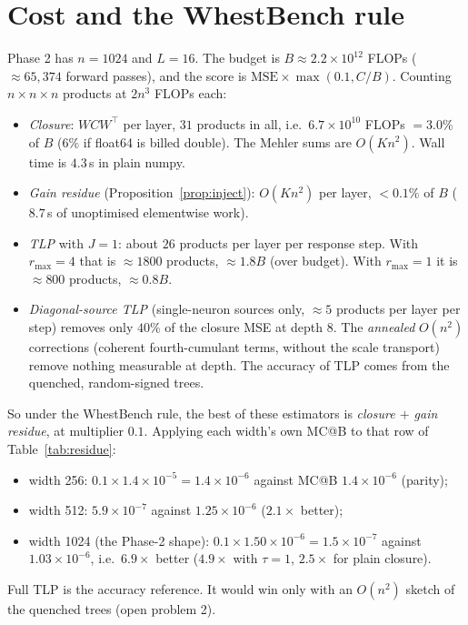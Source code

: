 \documentclass[11pt]{article}
\theoremstyle{definition}
\theoremstyle{remark}
\begin{document}
\section{Cost and the WhestBench rule}\label{sec:cost}
Phase 2 has $n=1024$ and $L=16$. The budget is $B\approx2.2\times10^{12}$ FLOPs ($\approx65{,}374$ forward passes), and the score is $\text{MSE}\times\max(0.1,C/B)$. Counting $n\times n\times n$ products at $2n^3$ FLOPs each:
\begin{itemize}
\item \emph{Closure}: $W C W^\top$ per layer, $31$ products in all, i.e.\ $6.7\times10^{10}$ FLOPs $=3.0\%$ of $B$ ($6\%$ if float64 is billed double). The Mehler sums are $O(Kn^2)$. Wall time is $4.3$\,s in plain numpy.
\item \emph{Gain residue} (Proposition~\ref{prop:inject}): $O(Kn^2)$ per layer, $<0.1\%$ of $B$ ($8.7$\,s of unoptimised elementwise work).
\item \emph{TLP} with $J=1$: about $26$ products per layer per response step. With $r_{\max}=4$ that is $\approx1800$ products, $\approx1.8B$ (over budget). With $r_{\max}=1$ it is $\approx800$ products, $\approx0.8B$.
\item \emph{Diagonal-source TLP} (single-neuron sources only, $\approx5$ products per layer per step) removes only $40\%$ of the closure MSE at depth 8. The \emph{annealed} $O(n^2)$ corrections (coherent fourth-cumulant terms, without the scale transport) remove nothing measurable at depth. The accuracy of TLP comes from the quenched, random-signed trees.
\end{itemize}
So under the WhestBench rule, the best of these estimators is \emph{closure $+$ gain residue}, at multiplier $0.1$. Applying each width's own MC@B to that row of Table~\ref{tab:residue}:
\begin{itemize}
\item width 256: $0.1\times1.4\times10^{-5}=1.4\times10^{-6}$ against MC@B $1.4\times10^{-6}$ (parity);
\item width 512: $5.9\times10^{-7}$ against $1.25\times10^{-6}$ ($2.1\times$ better);
\item width 1024 (the Phase-2 shape): $0.1\times1.50\times10^{-6}=1.5\times10^{-7}$ against $1.03\times10^{-6}$, i.e.\ $6.9\times$ better ($4.9\times$ with $\tau=1$, $2.5\times$ for plain closure).
\end{itemize}
Full TLP is the accuracy reference. It would win only with an $O(n^2)$ sketch of the quenched trees (open problem 2).
\end{document}
